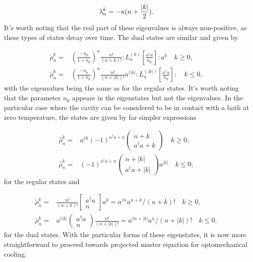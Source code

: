 \documentclass[12pt]{article}
\begin{document}
\begin{equation}
    \lambda_n^k=-\kappa (n+\frac{\abs{k}}{2}).
\end{equation} It's worth noting that the real part of these eigenvalues is always non-positive, as these types of states decay over time. The dual states are similar and given by

\begin{align}
    \check{\rho}_n^k=&(\frac{-n_p}{1+n_p})^{n} \frac{n !}{(n+k) !}: L_{n}^{(k)}\left[\frac{a^{\dagger} a}{n_p}\right]: a^{k} \quad  k \geq 0, \nonumber \\
   \check{\rho}_n^k=&(\frac{-n_p}{1+n_p})^{n} \frac{n !}{(n+|k|) !} a^{\dagger|k|}: L_{n}^{(|k|)}\left[\frac{a^{\dagger} a}{n_p}\right]: \quad k \leq 0, \nonumber
\end{align} with the eigenvalues being the same as for the regular states. It's worth noting that the parameter $n_p$ appears in the eigenstates but not the eigenvalues. In the particular case where the cavity can be considered to be in contact with a bath at zero temperature, the states are given by far simpler expressions

\begin{align}
    \hat{\rho}_n^k=&\nonumber a^{\dagger k}(-1)^{a^{\dagger} a+n}(\begin{array}{c}
n+k \\
a^{\dagger} a+k
\end{array}) \quad k \geq 0, \\
\hat{\rho}_n^k=& \nonumber (-1)^{a^{\dagger} a+n}(\begin{array}{c}
n+|k| \\
a^{\dagger} a+|k|
\end{array}) a^{|k|} \quad k \leq 0,
\end{align} for the regular states and 

\begin{align}
    \check{\rho}_n^k =&\nonumber  \frac{n !}{(n+k) !}\left[\begin{array}{c}
a^{\dagger} a \\
n
\end{array}\right] a^{k}=a^{\dagger n} a^{n+k} /(n+k) ! \quad k \geq 0,\\
\check{\rho}_n^k =&\nonumber a^{\dagger|k|}(\begin{array}{c}
a^{\dagger} a \\
n
\end{array}) \frac{n !}{(n+|k|) !}=a^{\dagger n+|k|} a^{n} /(n+|k|) ! \quad k \leq 0,
\end{align} for the dual states. With the particular forms of these eigenstates, it is now more straightforward to proceed towards projected master equation for optomechanical cooling.
\end{document}
